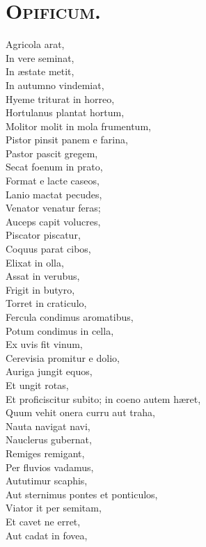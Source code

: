 \documentclass[12pt, twocolumn]{memoir}
\begin{document}
\section*{\textsc{Opificum.}}

Agricola arat,\\
In vere seminat,\\
In æstate metit,\\
In autumno vindemiat,\\
Hyeme triturat in horreo,\\
Hortulanus plantat hortum,\\
Molitor molit in mola frumentum,\\
Pistor pinsit panem e farina,\\
Pastor pascit gregem,\\
Secat foenum in prato,\\
Format e lacte caseos,\\
Lanio mactat pecudes,\\
Venator venatur feras;\\
Auceps capit volucres,\\
Piscator piscatur,\\
Coquus parat cibos,\\
Elixat in olla,\\
Assat in verubus,\\
Frigit in butyro,\\
Torret in craticulo,\\
Fercula condimus aromatibus,\\
Potum condimus in cella,\\
Ex uvis fit vinum,\\
Cerevisia promitur e dolio,\\
Auriga jungit equos,\\
Et ungit rotas,\\
Et proficiscitur subito; in coeno autem hæret,\\
Quum vehit onera curru aut traha,\\
Nauta navigat navi,\\
Nauclerus gubernat,\\
Remiges remigant,\\
Per fluvios vadamus,\\
Aututimur scaphis,\\
Aut sternimus pontes et ponticulos,\\
Viator it per semitam,\\
Et cavet ne erret,\\
Aut cadat in fovea,\\
\end{document}
